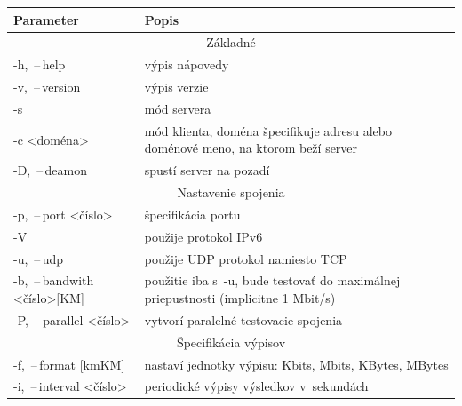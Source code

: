         \begin{table}[h!]
            \begin{center}
                \begin{tabular}{|l|p{9.2cm}|}
                    \hline
                     \textbf{Parameter}  &  \textbf{Popis}  \\
                    \hline
                    \multicolumn{2}{|c|}{Základné} \\ 
                    \hline
                    -h, \,--\,help     &   výpis nápovedy \\ 
                    -v, \,--\,version   &  výpis verzie  \\
                    -s              &  mód servera \\
                    -c \textless doména\textgreater &  mód klienta,
                        doména špecifikuje adresu
                        alebo doménové meno, na ktorom beží server\\
                    -D, \,--\,deamon   &  spustí server na pozadí \\
                    \hline
                    \multicolumn{2}{|c|}{Nastavenie spojenia} \\ 
                    \hline
                    -p, \,--\,port \textless číslo\textgreater  &
                        špecifikácia portu\\ 
                    -V                  &  použije protokol IPv6 \\
                    -u, \,--\,udp       &  použije UDP protokol namiesto TCP\\
                    -b, \,--\,bandwith \textless číslo\textgreater[KM]  &
                        použitie iba s~-u, bude testovať
                        do maximálnej priepustnosti (implicitne 1 Mbit/s) \\
                    -P, \,--\,parallel \textless číslo\textgreater &
                        vytvorí paralelné testovacie spojenia\\ 
                    \hline
                    \multicolumn{2}{|c|}{Špecifikácia výpisov} \\ 
                    \hline
                    -f, \,--\,format [kmKM] &
                        nastaví jednotky výpisu: Kbits, Mbits,
                        KBytes, MBytes \\
                    -i, \,--\,interval \textless číslo\textgreater &
                        periodické výpisy výsledkov v~sekundách\\

\end{tabular}
\end{center}
\end{table}
